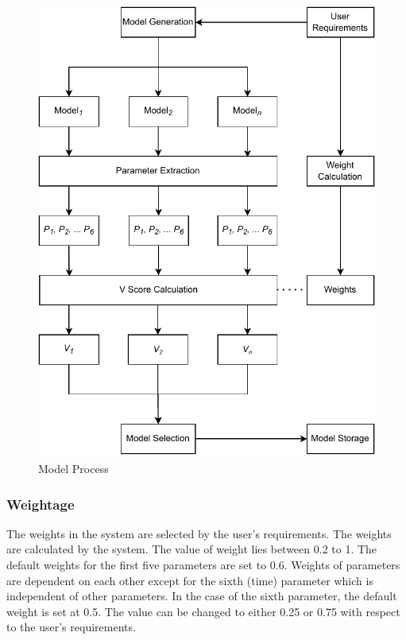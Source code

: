 \begin{figure}[ht]
    \centering
    \includegraphics[width=1.6\columnwidth]{media/sec03/math_model_relaxed.pdf}
    \caption{Model Process}
    \label{fig:model_process}
\end{figure}

\subsubsection{Weightage}\label{subsubsec:weightage}

The weights in the system are selected by the user's requirements. The weights are calculated by the system. The value of weight lies between 0.2 to 1. The default weights for the first five parameters are set to 0.6. Weights of parameters are dependent on each other except for the sixth (time) parameter which is independent of other parameters. In the case of the sixth parameter, the default weight is set at 0.5. The value can be changed to either 0.25 or 0.75 with respect to the user's requirements.


